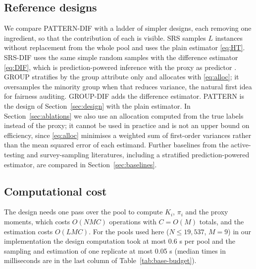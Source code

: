 \documentclass[pdflatex,sn-mathphys-num,iicol]{sn-jnl}
\theoremstyle{thmstyleone}
\theoremstyle{thmstyletwo}
\theoremstyle{thmstylethree}
\begin{document}
\subsection{Reference designs}
We compare PATTERN-DIF with a ladder of simpler designs, each removing one ingredient, so that the contribution of each is visible. SRS samples $L$ instances without replacement from the whole pool and uses the plain estimator \eqref{eq:HT}. SRS-DIF uses the same simple random samples with the difference estimator \eqref{eq:DIF}, which is prediction-powered inference with the proxy as predictor \citep{angelopoulos2023ppi}. GROUP stratifies by the group attribute only and allocates with \eqref{eq:alloc}; it oversamples the minority group when that reduces variance, the natural first idea for fairness auditing. GROUP-DIF adds the difference estimator. PATTERN is the design of Section~\ref{sec:design} with the plain estimator. In Section~\ref{sec:ablations} we also use an allocation computed from the true labels instead of the proxy; it cannot be used in practice and is not an upper bound on efficiency, since \eqref{eq:alloc} minimises a weighted sum of first-order variances rather than the mean squared error of each estimand. Further baselines from the active-testing and survey-sampling literatures, including a stratified prediction-powered estimator, are compared in Section~\ref{sec:baselines}.

\subsection{Computational cost}
The design needs one pass over the pool to compute $K_i$, $\pi_i$ and the proxy moments, which costs $O(NMC)$ operations with $C=O(M)$ totals, and the estimation costs $O(LMC)$. For the pools used here ($N\le 19{,}537$, $M=9$) in our implementation the design computation took at most 0.6 s per pool and the sampling and estimation of one replicate at most 0.05 s (median times in milliseconds are in the last column of Table~\ref{tab:base-budget}).

\end{document}
